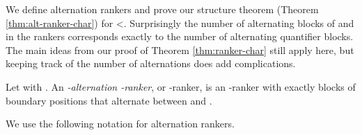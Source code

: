 \documentclass{LMCS}
\begin{document}
We define alternation rankers and prove our structure theorem (Theorem
\ref{thm:alt-ranker-char}) for <. Surprisingly the number
of alternating blocks of  and  in the rankers corresponds
exactly to the number of alternating quantifier blocks. The main ideas from
our proof of Theorem \ref{thm:ranker-char} still apply here, but keeping
track of the number of alternations does add complications.

\begin{defi} \label{def:alt-ranker} Let
   with . An \emph{-alternation -ranker}, or
  -ranker, is an -ranker with exactly  blocks of boundary
  positions that alternate between  and .
\end{defi}


We use the following notation for alternation rankers.
\end{document}
